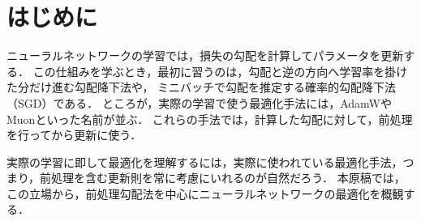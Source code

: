 \documentclass[../main.tex]{subfiles}
\begin{document}
\ifSubfilesClassLoaded{\setcounter{chapter}{0}}{}

\chapter{はじめに}

ニューラルネットワークの学習では，損失の勾配を計算してパラメータを更新する．
この仕組みを学ぶとき，最初に習うのは，勾配と逆の方向へ学習率を掛けた分だけ進む勾配降下法や，
ミニバッチで勾配を推定する確率的勾配降下法（SGD）である．
ところが，実際の学習で使う最適化手法には，AdamWやMuonといった名前が並ぶ．
これらの手法では，計算した勾配に対して，前処理を行ってから更新に使う．


実際の学習に即して最適化を理解するには，実際に使われている最適化手法，つまり，前処理を含む更新則を常に考慮にいれるのが自然だろう．
本原稿では，この立場から，前処理勾配法を中心にニューラルネットワークの最適化を概観する．


\chapterbibliography
\end{document}
